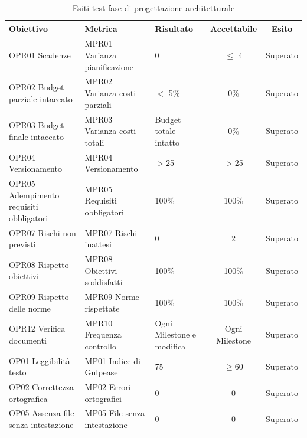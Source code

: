 \documentclass[../piano_di_qualifica.tex]{subfiles}
\begin{document}
\begin{table}[!ht]
	\centering
	\begin{tabular}{|p{4cm}|p{4cm}|l|c|c|}
		\hline
		\rowcolor{lightgray}
		\textbf{Obiettivo}            			& \textbf{Metrica}              & \textbf{Risultato}                    & \textbf{Accettabile} & \textbf{Esito} \\
		\hline
		OPR01 Scadenze		        			& MPR01 Varianza pianificazione & 0                             		& $\leq$ 4           	& Superato   	\\
		OPR02 Budget parziale intaccato        	& MPR02 Varianza costi parziali & $<$ 5\%								& 0\%                 	& Superato   	\\
		OPR03 Budget finale intaccato        	& MPR03 Varianza costi totali   & Budget totale intatto					& 0\%                  	& Superato      \\
		OPR04 Versionamento						& MPR04 Versionamento			& $>$25									& $>$25					& Superato		\\
		OPR05 Adempimento requisiti obbligatori & MPR05 Requisiti obbligatori 	& 100\%									& 100\%					& Superato		\\
		OPR07 Rischi non previsti				& MPR07 Rischi inattesi			& 0										& 2						& Superato	 	\\
		OPR08 Rispetto obiettivi      			& MPR08 Obiettivi soddisfatti   & 100\%                                 & 100\%                	& Superato      \\
		OPR09 Rispetto delle norme   			& MPR09 Norme rispettate        & 100\%                                 & 100\%                	& Superato      \\
		OPR12 Verifica documenti      			& MPR10 Frequenza controllo     & Ogni Milestone e modifica         	& Ogni Milestone       	& Superato      \\
		OP01 Leggibilità testo       			& MP01 Indice di Gulpease      	& 75                        			& \(\ge 60\)           	& Superato      \\
		OP02 Correttezza ortografica 			& MP02 Errori ortografici      	& 0                                     & 0                    	& Superato      \\
		OP05 Assenza file senza intestazione	& MP05 File senza intestazione 	& 0										& 0						& Superato		\\
		\hline
	\end{tabular}
	\caption{Esiti test fase di progettazione architetturale}
\end{table}
\end{document}
